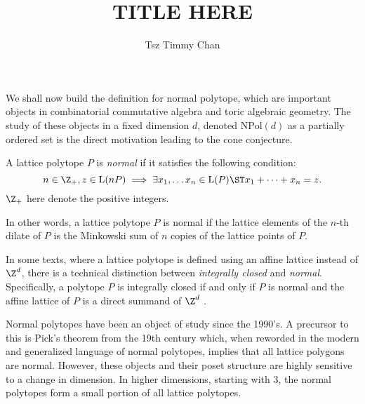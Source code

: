 \documentclass{TC}
\title{TITLE HERE}	%
\author{Tsz Timmy Chan}	%
\begin{document}
We shall now build the definition for normal polytope, which are important objects in combinatorial commutative algebra and toric algebraic geometry. The study of these objects in a fixed dimension $d$, denoted $\mathrm{NPol}(d)$ as a partially ordered set is the direct motivation leading to the cone conjecture.



\begin{definition}
A lattice polytope $P$ is \emph{normal} if it satisfies the following condition:
$$ n \in \Z_+, z \in \mathrm{L}(nP) \implies \exists x_1 , \ldots x_n \in \mathrm{L}(P) \ST x_1 + \cdots + x_n = z.$$
$\Z_+$ here denote the positive integers.
\end{definition}

In other words, a lattice polytope $P$ is normal if the lattice elements of the $n$-th dilate of $P$ is the Minkowski sum of $n$ copies of the lattice points of $P$.
\begin{remark}
In some texts, where a lattice polytope is defined using an affine lattice instead of $\Z^d$, there is a technical distinction between \emph{integrally closed} and \emph{normal}. Specifically, a polytope $P$ is integrally closed if and only if $P$ is normal and the affine lattice of $P$ is a direct summand of $\Z^d$ \cite{GubeladzeNormalPolytopeSurvey}.

Normal polytopes have been an object of study since the 1990's. A precursor to this is Pick's theorem from the 19th century which, when reworded in the modern and generalized language of normal polytopes, implies that all lattice polygons are normal. However, these objects and their poset structure are highly sensitive to a change in dimension. In higher dimensions, starting with 3, the normal polytopes form a small portion of all lattice polytopes. 
\end{remark}
\end{document}
